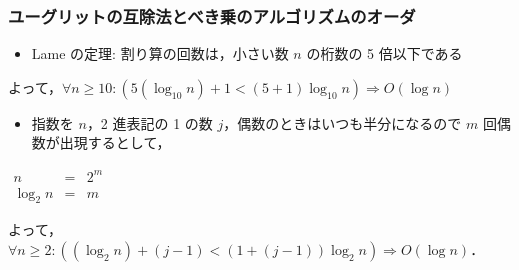 \begin{frame}[shrink]
\frametitle{ユーグリットの互除法とべき乗のアルゴリズムのオーダ}
  \begin{example}[ユーグリットの互除法]
    \begin{itemize}
\item Lame の定理: 割り算の回数は，小さい数 $n$ の桁数の 5 倍以下である
    \end{itemize}
よって，\(\forall n\ge 10:(5(\log_{10}n)+1<(5+1)\log_{10} n)\Rightarrow O(\log n)\)
  \end{example}
  \begin{example}[べき乗]
    \begin{itemize}
\item 指数を $n$，2 進表記の 1 の数 $j$，偶数のときはいつも半分になるので $m$ 回偶数が出現するとして，
    \end{itemize}
    \begin{center}
      \begin{math}
        \begin{array}{rcl}
n&=&2^m\\
\log_2 n &=& m
        \end{array}
      \end{math}
    \end{center}
よって， \(\forall n\ge2:((\log_2 n)+(j-1)<(1+(j-1))\log_2 n)\Rightarrow O(\log n)\)．
  \end{example}
\end{frame}
